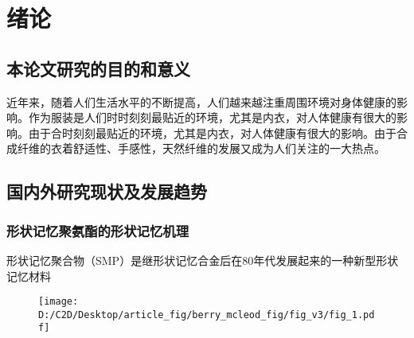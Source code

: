 

\label{第一章开始}
\chapter{绪论}

\section{本论文研究的目的和意义}

近年来，随着人们生活水平的不断提高，人们越来越注重周围环境对身体健康的影响。作为服装是人们时时刻刻最贴近的环境，尤其是内衣，对人体健康有很大的影响。由于合时刻刻最贴近的环境，尤其是内衣，对人体健康有很大的影响。由于合成纤维的衣着舒适性、手感性，天然纤维的发展又成为人们关注的一大热点\cite{berryOpticalSingularitiesBirefringent2003,ossikovskiConstitutiveRelationsOptically2021}。

\section{国内外研究现状及发展趋势}

\subsection{形状记忆聚氨酯的形状记忆机理}

形状记忆聚合物（SMP）是继形状记忆合金后在80年代发展起来的一种新型形状记忆材料

\begin{figure}[htbp]
	\centering
	\texttt{[image: D:/C2D/Desktop/article\_fig/berry\_mcleod\_fig/fig\_v3/fig\_1.pdf]}
\end{figure}


